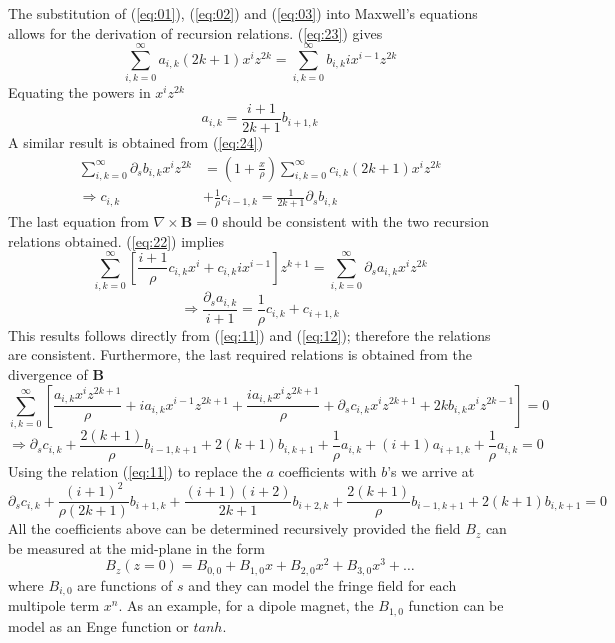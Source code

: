 The substitution of (\ref{eq:01}), (\ref{eq:02}) and (\ref{eq:03}) into  Maxwell's equations allows for the derivation of recursion relations. (\ref{eq:23}) gives
    \begin{equation}
		\sum_{i,k=0}^{\infty} a_{i,k} (2k+1) x^i z^{2k} = \sum_{i,k=0}^{\infty} b_{i,k} i x^{i-1} z^{2k}
	\end{equation}	
Equating the powers in $x^i z^{2k}$ 
	\begin{equation} 
		a_{i,k} = \frac{i+1}{2k+1} b_{i+1,k} \label{eq:11}
	\end{equation}
A similar result is obtained from (\ref{eq:24})
  	\begin{align}
		\sum_{i,k=0}^{\infty} \partial_s b_{i,k} x^i z^{2k} & = \left( 1+ \frac{x}{\rho} \right) \sum_{i,k=0}^{\infty} c_{i,k} (2k+1) x^i z^{2k} \\
		\Rightarrow c_{i,k}  & + \frac{1}{\rho} c_{i-1,k} = \frac{1}{2k+1} \partial_s b_{i,k} \label{eq:12} 
	\end{align}
The last equation from $\nabla \times \mathbf{B} = 0$ should be consistent with the two recursion relations obtained. (\ref{eq:22}) implies
    \begin{equation}
		\sum_{i,k=0}^{\infty} \left[ \frac{i+1}{\rho} c_{i,k} x^i + c_{i,k} i x^{i-1} \right] z^{k+1} = \sum_{i,k=0}^{\infty} \partial_s a_{i,k} x^i z^{2k} 
	\end{equation}
	\begin{equation}
		\Rightarrow \frac{\partial_s a_{i,k}}{i+1} = \frac{1}{\rho} c_{i,k} + c_{i+1,k}
	\end{equation}	
This results follows directly from (\ref{eq:11}) and (\ref{eq:12}); therefore the relations are consistent. Furthermore, the last required relations is obtained from the divergence of \textbf{B}
	\begin{equation}
		\sum_{i,k=0}^{\infty} \left[ \frac{a_{i,k} x^i z^{2k+1}}{\rho}  + i a_{i,k} x^{i-1} z^{2k+1} + \frac{i a_{i,k} x^i z^{2k+1}}{\rho}  + \partial_s c_{i,k} x^i z^{2k+1} + 2kb_{i,k}x^i z^{2k-1} \right] = 0 \nonumber
	\end{equation}
	\begin{equation}
		\Rightarrow \partial_s c_{i,k} + \frac{2(k+1)}{\rho} b_{i-1,k+1} + 2(k+1) b_{i,k+1} + \frac{1}{\rho} a_{i,k} + (i+1) a_{i+1,k} + \frac{1}{\rho} a_{i,k} = 0 \nonumber
	\end{equation}
Using the relation (\ref{eq:11}) to replace the $a$ coefficients with $b$'s we arrive at
	\begin{equation}
		\partial_s c_{i,k} + \frac{(i+1)^2}{\rho (2k+1)} b_{i+1,k} + \frac{(i+1)(i+2)}{2k+1} b_{i+2,k} + \frac{2(k+1)}{\rho} b_{i-1,k+1} + 2(k+1) b_{i,k+1} = 0
	\end{equation}
All the coefficients above can be determined recursively provided the field $B_z$ can be measured at the mid-plane in the form
	\begin{equation}
		B_z(z=0) = B_{0,0} + B_{1,0}x + B_{2,0} x^2 + B_{3,0} x^3 + \dots
	\end{equation}
where $B_{i,0}$ are functions of $s$ and they can model the fringe field for each multipole term $x^n$. As an example, for a dipole magnet, the $B_{1,0}$ function can be model as an Enge function or $tanh$. 

